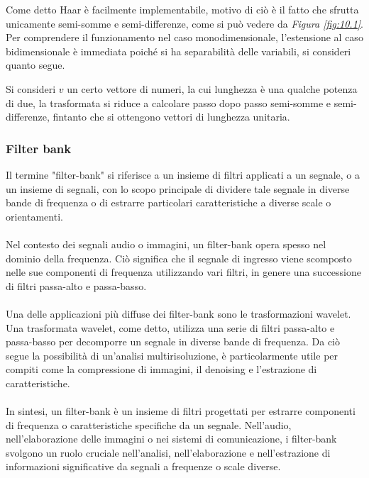\documentclass{subfiles}
\begin{document}
Come detto Haar è facilmente implementabile, motivo di ciò è il fatto che sfrutta unicamente semi-somme e semi-differenze\footnotemark[9], come si può vedere da \emph{Figura \ref{fig:10.1}}.
Per comprendere il funzionamento nel caso monodimensionale, l'estensione al caso bidimensionale è immediata poiché si ha separabilità delle variabili, si consideri quanto segue.

Si consideri \(v\) un certo vettore di numeri, la cui lunghezza è una qualche potenza di due, la trasformata si riduce a calcolare passo dopo passo semi-somme e semi-differenze\footnotemark[15],
fintanto che si ottengono vettori di lunghezza unitaria.




\subsubsection{Filter bank}
Il termine "filter-bank" si riferisce a un insieme di filtri applicati a un segnale, o a un insieme di segnali,
con lo scopo principale di dividere tale segnale in diverse bande di frequenza o di estrarre particolari caratteristiche a diverse scale o orientamenti.
\\ \\
Nel contesto dei segnali audio o immagini, un filter-bank opera spesso nel dominio della frequenza.
Ciò significa che il segnale di ingresso viene scomposto nelle sue componenti di frequenza utilizzando vari filtri, in genere una successione di filtri passa-alto e passa-basso.
\\ \\
Una delle applicazioni più diffuse dei filter-bank sono le trasformazioni wavelet.
Una trasformata wavelet, come detto, utilizza una serie di filtri passa-alto e passa-basso per decomporre un segnale in diverse bande di frequenza.
Da ciò segue la possibilità di un'analisi multirisoluzione, è particolarmente utile per compiti come la compressione di immagini, il denoising e l'estrazione di caratteristiche.
\\ \\
In sintesi, un filter-bank è un insieme di filtri progettati per estrarre componenti di frequenza o caratteristiche specifiche da un segnale.
Nell'audio, nell'elaborazione delle immagini o nei sistemi di comunicazione, i filter-bank svolgono un ruolo cruciale nell'analisi,
nell'elaborazione e nell'estrazione di informazioni significative da segnali a frequenze o scale diverse.
\end{document}
